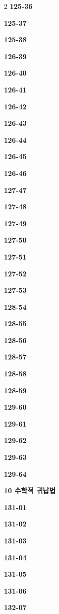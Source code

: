 \documentclass[10pt,a4paper]{article}
\begin{document}
\begin{multicols}{2}
\noindent\textbf{125-36}\ \par
\noindent\textbf{125-37}\ \par
\noindent\textbf{125-38}\ \par
\noindent\textbf{126-39}\ \par
\noindent\textbf{126-40}\ \par
\noindent\textbf{126-41}\ \par
\noindent\textbf{126-42}\ \par
\noindent\textbf{126-43}\ \par
\noindent\textbf{126-44}\ \par
\noindent\textbf{126-45}\ \par
\noindent\textbf{126-46}\ \par
\noindent\textbf{127-47}\ \par
\noindent\textbf{127-48}\ \par
\noindent\textbf{127-49}\ \par
\noindent\textbf{127-50}\ \par
\noindent\textbf{127-51}\ \par
\noindent\textbf{127-52}\ \par
\noindent\textbf{127-53}\ \par
\noindent\textbf{128-54}\ \par
\noindent\textbf{128-55}\ \par
\noindent\textbf{128-56}\ \par
\noindent\textbf{128-57}\ \par
\noindent\textbf{128-58}\ \par
\noindent\textbf{128-59}\ \par
\noindent\textbf{129-60}\ \par
\noindent\textbf{129-61}\ \par
\noindent\textbf{129-62}\ \par
\noindent\textbf{129-63}\ \par
\noindent\textbf{129-64}\ \par
\noindent\textbf{10 수학적 귀납법}\par\smallskip
\noindent\textbf{131-01}\ \par
\noindent\textbf{131-02}\ \par
\noindent\textbf{131-03}\ \par
\noindent\textbf{131-04}\ \par
\noindent\textbf{131-05}\ \par
\noindent\textbf{131-06}\ \par
\noindent\textbf{132-07}\ \par

\end{multicols}
\end{document}
